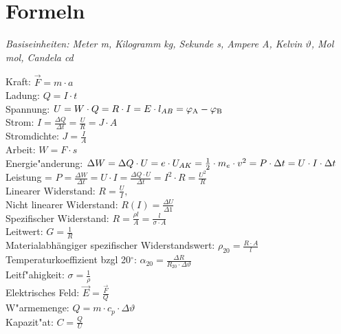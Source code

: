 \section{Formeln}

\textit{Basiseinheiten: Meter m, Kilogramm kg, Sekunde s, Ampere A, Kelvin $\vartheta$, Mol mol, Candela cd} \\
\begin{minipage}{12cm}
	Kraft: $\overrightarrow{F} = m \cdot a$ \\ 
	Ladung: $Q = I \cdot t$\\
	Spannung: $U = W \cdot Q = R \cdot I = E \cdot l_{AB} = \varphi \textsubscript{A} - \varphi \textsubscript{B}$\\
	Strom: $I = \frac{\Delta Q}{\Delta t} = \frac{U}{R} = J \cdot A $\\
	Stromdichte: $J=\frac {I}{A}$\\
	Arbeit: $W = F \cdot s$ \\
	Energie"anderung: $\Delta W = \Delta Q \cdot U = e \cdot U_{AK} = \frac{1}{2} \cdot m_{e}  \cdot v^2 = \\ P \cdot \Delta t = U \cdot I \cdot \Delta t$ \\
	Leistung = $P = \frac{\Delta W}{\Delta t}= U \cdot I = \frac{\Delta Q \cdot U}{\Delta t} = I^2 \cdot R = \frac{U^2}{R} $\hspace{10pt}\\
	Linearer Widerstand: $R = \frac{U}{I}, \; $\\
	Nicht linearer Widerstand: $R(I) = \frac{\Delta U}{\Delta 1}$ \\
	Spezifischer Widerstand: $R = \frac{\rho\mathit{l}}{A}=\frac{\mathit{l}}{\sigma \cdot A}$\\
	Leitwert: $G = \frac{1}{R}$ \\
	Materialabhängiger spezifischer Widerstandswert: $\rho_{20} = \frac{R \cdot A}{l} $\\
	Temperaturkoeffizient bzgl 20$^\circ$: $\alpha_{20}=\frac{\Delta R}{ R_{20} \cdot \Delta \vartheta}$ \\
	Leitf"ahigkeit: $\sigma = \frac{1}{\rho}$ \\
	Elektrisches Feld: $\overrightarrow{E} = \frac{\overrightarrow{F}}{Q}$\\
	W"armemenge: $Q = m \cdot c_{p} \cdot \Delta\vartheta$ \\
	Kapazit"at: $C = \frac{Q}{U}$
\end{minipage}
